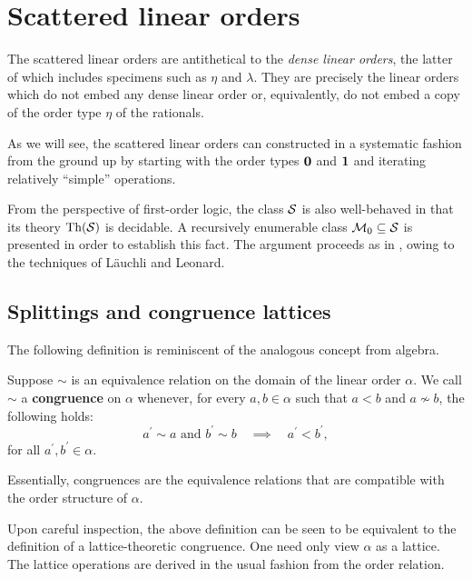 

\chapter{Scattered linear orders}

The scattered linear orders are antithetical to the \textit{dense linear
orders}, the latter of which includes specimens such as $\eta$ and $\lambda$.
They are precisely the linear orders which do not embed any dense linear order
or, equivalently, do not embed a copy of the order type $\eta$ of the
rationals.

As we will see, the scattered linear orders can constructed in a systematic
fashion from the ground up by starting with the order types $\mathbf{0}$ and $\mathbf{1}$
and iterating relatively ``simple'' operations.

From the perspective of first-order logic, the class $\mathcal{S}$ is also
well-behaved in that its theory $\operatorname{Th}(\mathcal{S})$ is decidable.  A recursively
enumerable class $\mathcal{M}_0\subseteq\mathcal{S}$ is presented in order to establish
this fact.  The argument proceeds as in \cite{RosLin}, owing to the techniques
of L\"auchli and Leonard.

\section{Splittings and congruence lattices}

The following definition is reminiscent of the analogous concept from algebra.

\begin{dfn}[Congruence]
	Suppose $\sim$ is an equivalence relation on the domain of the linear order
	$\alpha$.  We call $\sim$ a \textbf{congruence} on $\alpha$ whenever, for
	every $a,b\in\alpha$ such that $a<b$ and $a\nsim b$, the following
	holds:
	\begin{equation}
		a^\prime\sim a\text{ and }b^\prime\sim b\quad\implies\quad
		a^\prime<b^\prime,
	\end{equation}
	for all $a^\prime,b^\prime\in\alpha$.
\end{dfn}

Essentially, congruences are the equivalence relations that are compatible with
the order structure of $\alpha$.

Upon careful inspection, the above definition can be seen to be equivalent to
the definition of a lattice-theoretic congruence.  One need only view $\alpha$
as a lattice.  The lattice operations are derived in the usual fashion from the
order relation.


